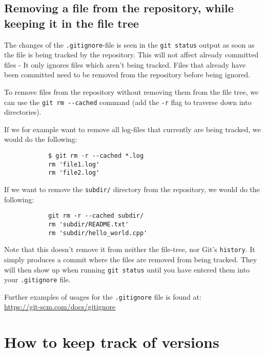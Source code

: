 \documentclass[../main/git_course_main.tex]{subfiles}
\begin{document}
	\subsection{Removing a file from the repository, while keeping it in the file tree}
	
	The changes of the \verb$.gitignore$-file is seen in the \verb$git status$
	output as soon as the file is being tracked by the repository. This will not affect already committed files - It only ignores files which aren't being tracked. Files that already have been committed need to be removed from the repository before being ignored.
	
	To remove files from the repository without removing them from the file tree, we can use the \verb$git rm --cached$ command (add the \verb$-r$ flag to traverse down into directories).
	
	If we for example want to remove all log-files that currently are being tracked, we would do the following:
	
	\begin{codebox}
		\begin{lstlisting}
			$ git rm -r --cached *.log
			rm 'file1.log'
			rm 'file2.log'
		\end{lstlisting}
	\end{codebox}
	
	If we want to remove the \verb$subdir/$ directory from the repository, we would do the following:
	
	\begin{codebox}
		\begin{lstlisting}
			git rm -r --cached subdir/
			rm 'subdir/README.txt'
			rm 'subdir/hello_world.cpp'
		\end{lstlisting}
	\end{codebox}
	
	Note that this doesn't remove it from neither the file-tree, nor Git's \verb$history$. It simply produces a commit where the files are removed from being tracked. They will then show up when running \verb$git status$ until you have entered them into your \verb$.gitignore$ file.
	
	Further examples of usages for the \verb$.gitignore$ file is found at: \\
	
	\url{https://git-scm.com/docs/gitignore}
	
	\section{How to keep track of versions}
	
\end{document}
